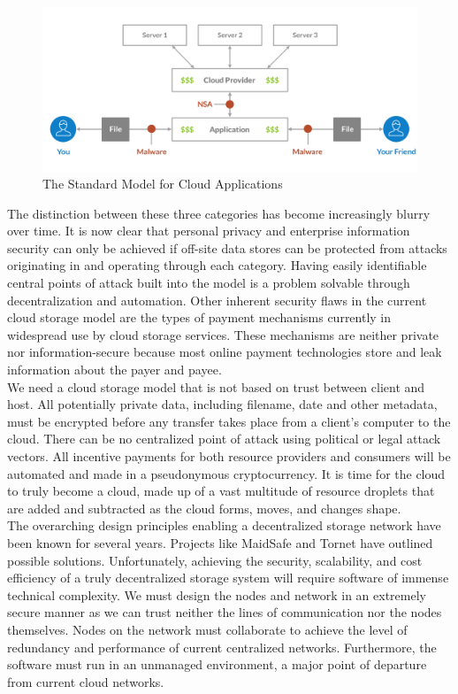 \documentclass[a4paper,10pt]{article}
\begin{document}
\begin{figure}[h!]
  \centering
      \includegraphics[width=\linewidth]{01}
  \caption{The Standard Model for Cloud Applications}
\end{figure}

The distinction between these three categories has become increasingly blurry over time. It is now clear that personal privacy and enterprise information security can only be achieved if off-site data stores can be protected from attacks originating in and operating through each category.  Having easily identifiable central points of attack built into the model is a problem solvable through decentralization and automation. Other inherent security flaws in the current cloud storage model are the types of payment mechanisms currently in widespread use by cloud storage services. These mechanisms are neither private nor information-secure because most online payment technologies store and leak information about the payer and payee.\\

We need a cloud storage model that is not based on trust between client and host.  All potentially private data, including filename, date and other metadata, must be encrypted before any transfer takes place from a client’s computer to the cloud.  There can be no centralized point of attack using political or legal attack vectors.  All incentive payments for both resource providers and consumers will be automated and made in a pseudonymous cryptocurrency.  It is time for the cloud to truly become a cloud, made up of a vast multitude of resource droplets that are added and subtracted as the cloud forms, moves, and changes shape.\\

The overarching design principles enabling a decentralized storage network have been known for several years. Projects like MaidSafe \cite{1} and Tornet \cite{2} have outlined possible solutions. Unfortunately, achieving the security, scalability, and cost efficiency of a truly decentralized storage system will require software of immense technical complexity. We must design the nodes and network in an extremely secure manner as we can trust neither the lines of communication nor the nodes themselves. Nodes on the network must collaborate to achieve the level of redundancy and performance of current centralized networks. Furthermore, the software must run in an unmanaged environment, a major point of departure from current cloud networks.   \\
\end{document}
